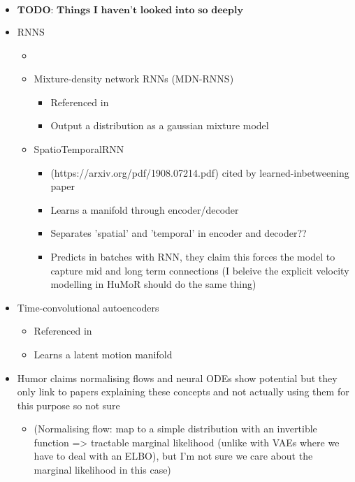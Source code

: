 \begin{itemize}
    \item $\textbf{TODO: Things I haven't looked into so deeply}$
    \item RNNS
    \begin{itemize}
        \item \cite{RobustMotionInbetweening}
        \item Mixture-density network RNNs (MDN-RNNS)
        \begin{itemize}
            \item Referenced in \cite{MVAE}
            \item Output a distribution as a gaussian mixture model
        \end{itemize}
        \item SpatioTemporalRNN
        \begin{itemize}
            \item (https://arxiv.org/pdf/1908.07214.pdf) cited by  learned-inbetweening paper \cite{learnedInbetweening}
            \item Learns a manifold through encoder/decoder
            \item Separates 'spatial' and 'temporal' in encoder and decoder??
            \item Predicts in batches with RNN, they claim this forces the model to capture mid and long term connections (I beleive the explicit velocity modelling in HuMoR should do the same thing)
        \end{itemize}
    \end{itemize}
    \item Time-convolutional autoencoders
    \begin{itemize}
        \item Referenced in \cite{MVAE}
        \item Learns a latent motion manifold
    \end{itemize}
    \item Humor claims normalising flows and neural ODEs show potential but they only link to papers explaining these concepts and not actually using them for this purpose so not sure
    \begin{itemize}
        \item (Normalising flow: map to a simple distribution with an invertible function => tractable marginal likelihood (unlike with VAEs where we have to deal with an ELBO), but I'm not sure we care about the marginal likelihood in this case)
    \end{itemize}
\end{itemize}


